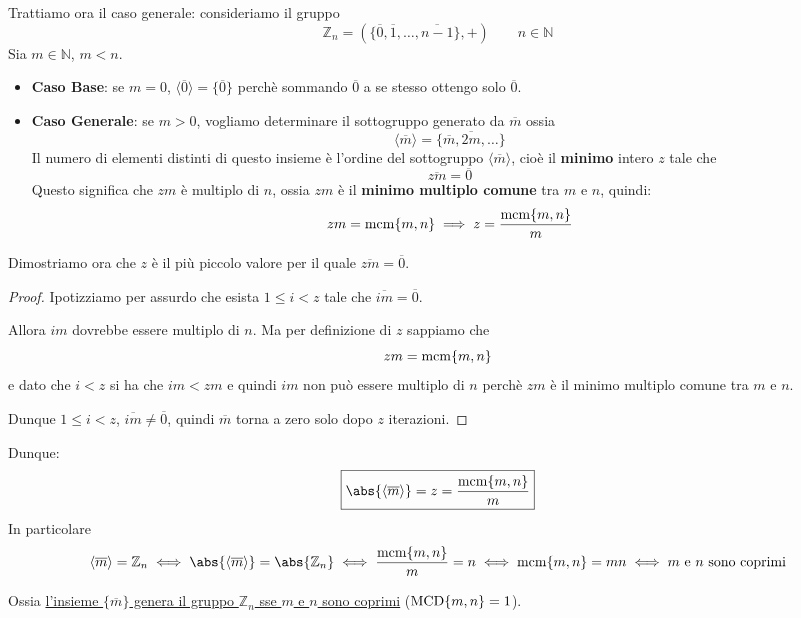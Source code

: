 \documentclass[../main.tex]{subfiles}
\begin{document}
Trattiamo ora il caso generale: consideriamo il gruppo
\[
    \mathbb{Z}_n = (\{\overline{0},\overline{1},\ldots,\overline{n-1}\},+) \qquad n \in \mathbb{N}
\]
Sia $m \in \mathbb{N}$, $m < n$.

\begin{itemize}
    \item \textbf{Caso Base}: se $m=0$, $\langle \overline{0} \rangle = \{\overline{0}\}$ perchè sommando $\overline{0}$ a se stesso ottengo solo $\overline{0}$.
    \item \textbf{Caso Generale}: se $m > 0$, vogliamo determinare il sottogruppo generato da $\overline{m}$ ossia
          \[
              \langle \overline{m} \rangle = \{\overline{m},\overline{2m},\ldots\}
          \]
          Il numero di elementi distinti di questo insieme è l'ordine del sottogruppo $\langle \overline{m} \rangle$, cioè il \textbf{minimo} intero $z$ tale che
          \[
              \overline{zm} = \overline{0}
          \]
          Questo significa che $zm$ è multiplo di $n$, ossia $zm$ è il \textbf{minimo multiplo comune} tra $m$ e $n$, quindi:
          \[
              zm = \operatorname{mcm} \{m,n\} \implies z = \frac{\operatorname{mcm} \{m,n\}}{m}
          \]
\end{itemize}
Dimostriamo ora che $z$ è il più piccolo valore per il quale $\overline{zm} = \overline{0}$.

\begin{proof}
    Ipotizziamo per assurdo che esista $1 \leq i < z$ tale che $\overline{im} = \overline{0}$.

    Allora $im$ dovrebbe essere multiplo di $n$. Ma per definizione di $z$ sappiamo che
    \[
        zm = \operatorname{mcm} \{m,n\}
    \]
    e dato che $i < z$ si ha che $im < zm$ e quindi $im$ non può essere multiplo di $n$ perchè $zm$ è il minimo multiplo comune tra $m$ e $n$.

    Dunque $1 \leq i < z$, $\overline{im} \neq \overline{0}$, quindi $\overline{m}$ torna a zero solo dopo $z$ iterazioni.
\end{proof}
Dunque:
\[
    \boxed{
        \abs{\langle \overline{m} \rangle} = z = \frac{\mcm \{m,n\}}{m}
    }
\]
In particolare
\[
    \langle \overline{m} \rangle = \mathbb{Z}_n \iff \abs{\langle \overline{m} \rangle} = \abs{\mathbb{Z}_n} \iff \frac{\mcm \{m,n\}}{m} = n \iff \mcm \{m,n\} = mn \iff m \text{ e } n \text{ sono coprimi}
\]

Ossia \underline{l'insieme $\{\overline{m}\}$ genera il gruppo $\mathbb{Z}_n$ sse $m$ e $n$ sono coprimi} ($\operatorname{MCD} \{m,n\}=1$).
\end{document}
